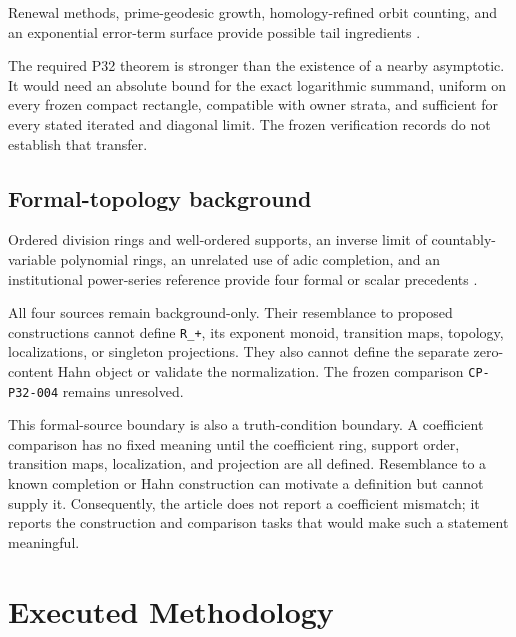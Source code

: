 \documentclass[11pt]{article}
\begin{document}
Renewal methods, prime-geodesic growth, homology-refined orbit counting,
and an exponential error-term surface provide possible tail ingredients
\citep{P32-S19,P32-S20,P32-S21,P32-S22}.

The required P32 theorem is stronger than the existence of a nearby
asymptotic. It would need an absolute bound for the exact logarithmic
summand, uniform on every frozen compact rectangle, compatible with
owner strata, and sufficient for every stated iterated and diagonal
limit. The frozen verification records do not establish that transfer.

\hypertarget{25-formal-topology-background}{%
\subsection{Formal-topology
background}\label{25-formal-topology-background}}

Ordered division rings and well-ordered supports, an inverse limit of
countably-variable polynomial rings, an unrelated use of adic
completion, and an institutional power-series reference provide four
formal or scalar precedents
\citep{P32-S23,P32-S24,P32-S25,P32-S26}.

All four sources remain background-only. Their resemblance to proposed
constructions cannot define \texttt{R\_+}, its exponent monoid,
transition maps, topology, localizations, or singleton projections. They
also cannot define the separate zero-content Hahn object or validate the
normalization. The frozen comparison \texttt{CP-P32-004} remains
unresolved.

This formal-source boundary is also a truth-condition boundary. A
coefficient comparison has no fixed meaning until the coefficient ring,
support order, transition maps, localization, and projection are all
defined. Resemblance to a known completion or Hahn construction can
motivate a definition but cannot supply it. Consequently, the article
does not report a coefficient mismatch; it reports the construction and
comparison tasks that would make such a statement meaningful.

\hypertarget{3-executed-methodology}{%
\section{Executed Methodology}\label{3-executed-methodology}}
\end{document}
